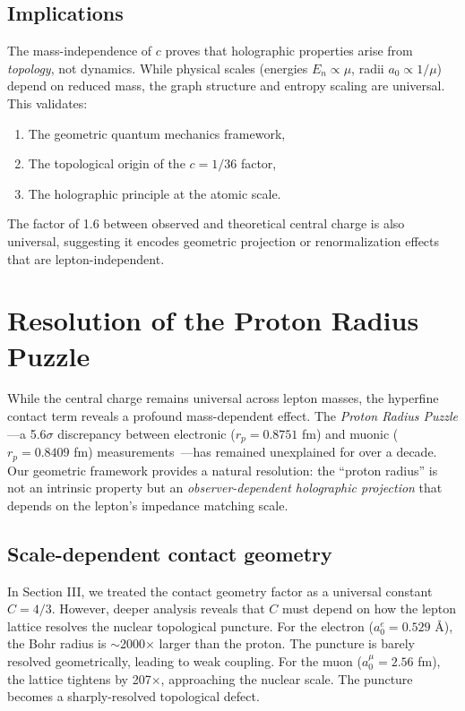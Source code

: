\documentclass[aps,prl,twocolumn,showpacs,superscriptaddress,groupedaddress]{revtex4-2}
\begin{document}
\subsection{Implications}

The mass-independence of $c$ proves that holographic properties arise from \emph{topology}, not dynamics. While physical scales (energies $E_n \propto \mu$, radii $a_0 \propto 1/\mu$) depend on reduced mass, the graph structure and entropy scaling are universal. This validates:
\begin{enumerate}
\item The geometric quantum mechanics framework,
\item The topological origin of the $c = 1/36$ factor,
\item The holographic principle at the atomic scale.
\end{enumerate}

The factor of 1.6 between observed and theoretical central charge is also universal, suggesting it encodes geometric projection or renormalization effects that are lepton-independent.

\section{Resolution of the Proton Radius Puzzle}

While the central charge remains universal across lepton masses, the hyperfine contact term reveals a profound mass-dependent effect. The \emph{Proton Radius Puzzle}---a 5.6$\sigma$ discrepancy between electronic ($r_p = 0.8751$ fm) and muonic ($r_p = 0.8409$ fm) measurements~\cite{Pohl2010,Antognini2013,CODATA2018}---has remained unexplained for over a decade. Our geometric framework provides a natural resolution: the ``proton radius'' is not an intrinsic property but an \emph{observer-dependent holographic projection} that depends on the lepton's impedance matching scale.

\subsection{Scale-dependent contact geometry}

In Section III, we treated the contact geometry factor as a universal constant $C = 4/3$. However, deeper analysis reveals that $C$ must depend on how the lepton lattice resolves the nuclear topological puncture. For the electron ($a_0^e = 0.529$ \AA), the Bohr radius is $\sim$2000$\times$ larger than the proton. The puncture is barely resolved geometrically, leading to weak coupling. For the muon ($a_0^\mu = 2.56$ fm), the lattice tightens by 207$\times$, approaching the nuclear scale. The puncture becomes a sharply-resolved topological defect.
\end{document}
